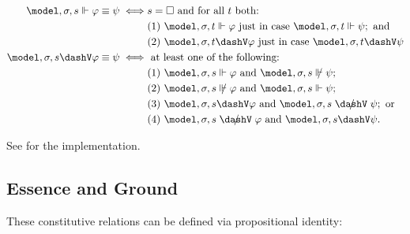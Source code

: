 \documentclass[../LogosReference.tex]{subfiles}
\begin{document}
\begin{definition}\label{def:propid-verification}
	\begin{align}
		\model, \assignment, s \verifies \metaA \equiv \metaB  \iff
		 & s = \nullstate \text{ and for all } t \text{ both:} \notag                                                                     \\
		 & (1)~ \model, \assignment, t \verifies \metaA \text{ just in case } \model, \assignment, t \verifies \metaB; \text{ and} \notag \\
		 & (2)~ \model, \assignment, t \falsifies \metaA \text{ just in case } \model, \assignment, t \falsifies \metaB                   \\
		\model, \assignment, s \falsifies \metaA \equiv \metaB \iff
		 & \text{ at least one of the following:} \notag                                                                                                         \\
		 & (1)~ \model, \assignment, s \verifies \metaA \text{ and } \model, \assignment, s \nverifies \metaB; \notag                     \\
		 & (2)~ \model, \assignment, s \nverifies \metaA \text{ and } \model, \assignment, s \verifies \metaB; \notag                     \\
		 & (3)~ \model, \assignment, s \falsifies \metaA \text{ and } \model, \assignment, s \nfalsifies \metaB; \text{ or} \notag        \\
		 & (4)~ \model, \assignment, s \nfalsifies \metaA \text{ and } \model, \assignment, s \falsifies \metaB.
	\end{align}
\end{definition}

\noindent
See  for the implementation.


\subsection{Essence and Ground}\label{sec:essence-ground}

These constitutive relations can be defined via propositional identity:

\end{document}
